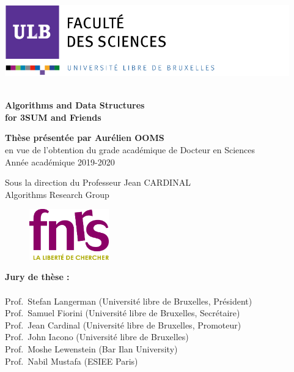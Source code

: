 \documentclass[b5paper,12pt]{article}
\begin{document}
\includegraphics[width=12.3cm, height=3.07cm]{sciences.png} \\ \\

\begin{tcolorbox}
\color[rgb]{1,1,1}

\Large{\textbf{Algorithms and Data Structures\\ for 3SUM and Friends}}
\end{tcolorbox}

\begin{tcolorbox}[colback=white, halign=left]
\color{darkblue}
\large{\textbf{Thèse présentée par Aurélien OOMS}} \\
\color{black}
\small{en vue de l'obtention du grade académique de Docteur en Sciences \\
Année académique 2019-2020}

\vspace{2cm}

\begin{flushright}
\color{darkblue}
Sous la direction du Professeur Jean CARDINAL \\
\color{black}
Algorithms Research Group
\end{flushright}
\end{tcolorbox}
\vspace{3cm}


\begin{figure}
\includegraphics[trim=0 0 0 -2.1cm,width=3.45cm]{fnrs.png}
\end{figure}
\noindent
\textbf{Jury de thèse : } \\  \\
Prof.~Stefan Langerman (Université libre de Bruxelles, Président) \\
Prof.~Samuel Fiorini (Université libre de Bruxelles, Secrétaire) \\
Prof.~Jean Cardinal (Université libre de Bruxelles, Promoteur) \\
Prof.~John Iacono (Université libre de Bruxelles) \\
Prof.~Moshe Lewenstein (Bar Ilan University) \\
Prof.~Nabil Mustafa (ESIEE Paris) \\
\end{document}
